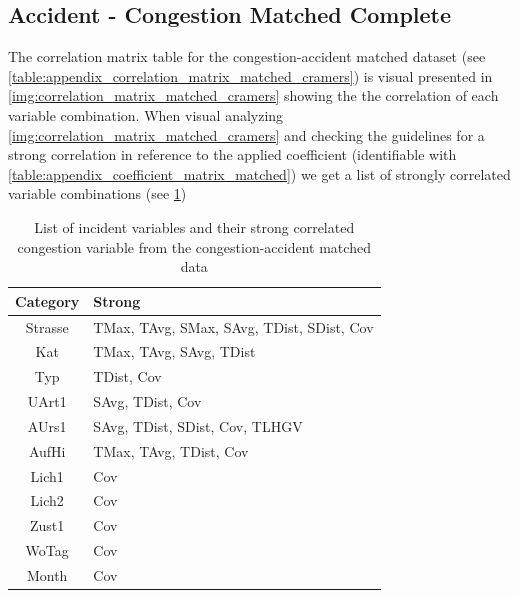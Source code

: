 \subsection{Accident - Congestion Matched Complete}
\label{analysis_processing_correlation_baysis_matched}
The correlation matrix table for the congestion-accident matched dataset (see \cref{table:appendix_correlation_matrix_matched_cramers}) is visual presented in \cref{img:correlation_matrix_matched_cramers} showing the the correlation of each variable combination. When visual analyzing \cref{img:correlation_matrix_matched_cramers} and checking the guidelines for a strong correlation in reference to the applied coefficient (identifiable with \cref{table:appendix_coefficient_matrix_matched}) we get a list of strongly correlated variable combinations (see \cref{tbl:correlation_list_baysis_matched})

\begin{table}[ht]
	\centering
	\begin{tabular}{c|l}  
		\toprule
		Category & Strong \\
		\midrule
		Strasse & TMax, TAvg, SMax, SAvg, TDist, SDist, Cov \\ 
 		Kat & TMax, TAvg, SAvg, TDist \\
 		Typ & TDist, Cov \\
 		UArt1 & SAvg, TDist, Cov \\
 		AUrs1 & SAvg, TDist, SDist, Cov, TLHGV \\
 		AufHi & TMax, TAvg, TDist, Cov \\
 		Lich1 & Cov \\
 		Lich2 & Cov \\
 		Zust1 & Cov \\
 		WoTag & Cov \\
		Month & Cov \\
		\bottomrule
	\end{tabular}
	\caption{List of incident variables and their strong correlated congestion variable from the congestion-accident matched data}
	\label{tbl:correlation_list_baysis_matched}
\end{table}

